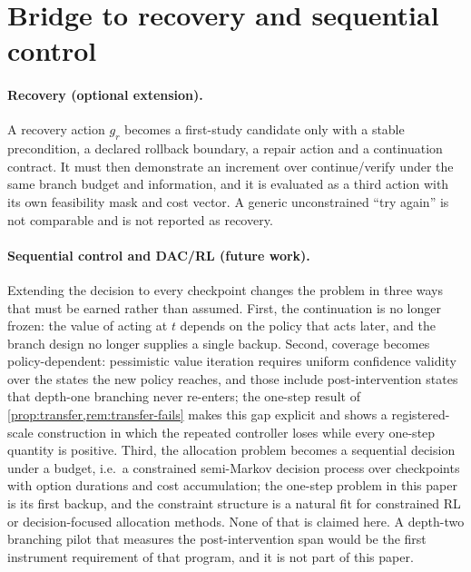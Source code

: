 \section{Bridge to recovery and sequential control}
\label{sec:b-bridge}

\paragraph{Recovery (optional extension).}
A recovery action $g_r$ becomes a first-study candidate only with a stable
precondition, a declared rollback boundary, a repair action and a continuation
contract.  It must then demonstrate an increment over continue/verify under the
same branch budget and information, and it is evaluated as a third action with
its own feasibility mask and cost vector.  A generic unconstrained ``try again''
is not comparable and is not reported as recovery.

\paragraph{Sequential control and DAC/RL (future work).}
Extending the decision to every checkpoint changes the problem in three ways
that must be earned rather than assumed.  First, the continuation is no longer
frozen: the value of acting at $t$ depends on the policy that acts later, and
the branch design no longer supplies a single backup.  Second, coverage becomes
policy-dependent: pessimistic value iteration requires uniform confidence
validity over the states the new policy reaches, and those include
post-intervention states that depth-one branching never re-enters; the one-step
result of \cref{prop:transfer,rem:transfer-fails} makes this gap explicit and
shows a registered-scale construction in which the repeated controller loses
while every one-step quantity is positive.  Third, the allocation problem
becomes a sequential decision under a budget, i.e.\ a constrained
semi-Markov decision process over checkpoints with option durations and cost
accumulation; the one-step problem in this paper is its first backup, and the
constraint structure is a natural fit for constrained RL or decision-focused
allocation methods.  None of that is claimed here.  A depth-two branching pilot
that measures the post-intervention span would be the first instrument
requirement of that program, and it is not part of this paper.

